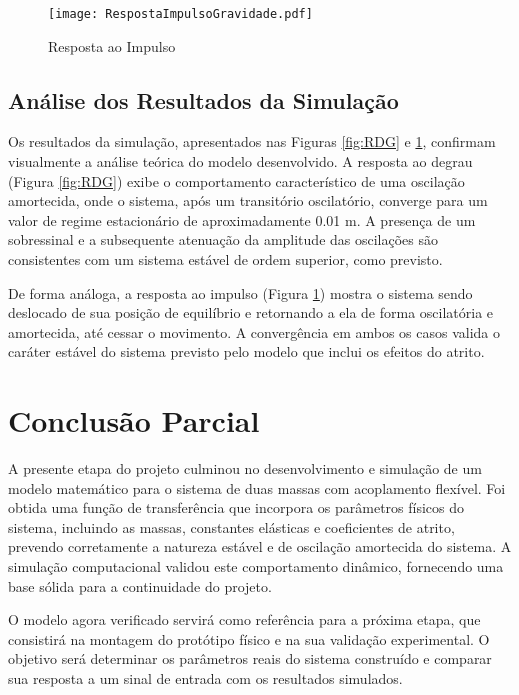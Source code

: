 \documentclass[9pt,a4paper,twocolumn,twoside]{tau-class/tau}
\begin{document}
\begin{figure}[H]
    \centering
    \texttt{[image: RespostaImpulsoGravidade.pdf]}
    \caption{Resposta ao Impulso}
    \label{fig:RIG}
\end{figure}


\subsection{Análise dos Resultados da Simulação}
Os resultados da simulação, apresentados nas Figuras \ref{fig:RDG} e \ref{fig:RIG}, confirmam visualmente a análise teórica do modelo desenvolvido. A resposta ao degrau (Figura \ref{fig:RDG}) exibe o comportamento característico de uma oscilação amortecida, onde o sistema, após um transitório oscilatório, converge para um valor de regime estacionário de aproximadamente 0.01 m. A presença de um sobressinal e a subsequente atenuação da amplitude das oscilações são consistentes com um sistema estável de ordem superior, como previsto.

De forma análoga, a resposta ao impulso (Figura \ref{fig:RIG}) mostra o sistema sendo deslocado de sua posição de equilíbrio e retornando a ela de forma oscilatória e amortecida, até cessar o movimento. A convergência em ambos os casos valida o caráter estável do sistema previsto pelo modelo que inclui os efeitos do atrito.

\section{Conclusão Parcial}

 A presente etapa do projeto culminou no desenvolvimento e simulação de um modelo matemático para o sistema de duas massas com acoplamento flexível. Foi obtida uma função de transferência que incorpora os parâmetros físicos do sistema, incluindo as massas, constantes elásticas e coeficientes de atrito, prevendo corretamente a natureza estável e de oscilação amortecida do sistema. A simulação computacional validou este comportamento dinâmico, fornecendo uma base sólida para a continuidade do projeto.

 O modelo agora verificado servirá como referência para a próxima etapa, que consistirá na montagem do protótipo físico e na sua validação experimental. O objetivo será determinar os parâmetros reais do sistema construído e comparar sua resposta a um sinal de entrada com os resultados simulados.



\printbibliography

\end{document}
